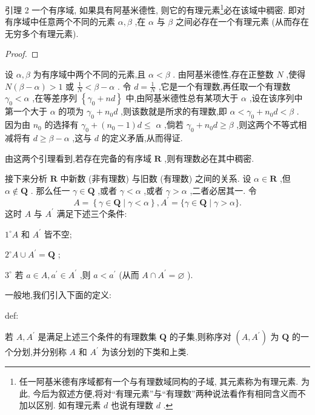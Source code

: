 引理 2 一个有序域, 如果具有阿基米德性, 则它的有理元素\footnote{任一阿基米德有序域都有一个与有理数域同构的子域, 其元素称为有理元素. 为此, 今后为叙述方便,将对“有理元素”与“有理数”两种说法看作有相同含义而不加以区别. 如有理元素 \(d\) 也说有理数 \(d\) .}必在该域中稠密. 即对有序域中任意两个不同的元素 \(\alpha ,\beta\) ,在 \(\alpha\) 与 \(\beta\) 之间必存在一个有理元素 (从而存在无穷多个有理元素).

\begin{proof}

\end{proof}
设 \(\alpha ,\beta\) 为有序域中两个不同的元素,且 \(\alpha  < \beta\) . 由阿基米德性,存在正整数 \(N\) ,使得 \(N\left( {\beta  - \alpha }\right)  > 1\) 或 \(\frac{1}{N} < \beta  - \alpha\) . 令 \(d = \frac{1}{N}\) ,它是一个有理数,再任取一个有理数 \({\gamma }_{0} < \alpha\) ,在等差序列 \(\left\{  {{\gamma }_{0} + {nd}}\right\}\) 中,由阿基米德性总有某项大于 \(\alpha\) ,设在该序列中第一个大于 \(\alpha\) 的项为 \({\gamma }_{0} + {n}_{0}d\) ,则该数就是所求的有理数,即 \(\alpha  < {\gamma }_{0} + {n}_{0}d < \beta\) . 因为由 \({n}_{0}\) 的选择有 \({\gamma }_{0} + \left( {{n}_{0} - 1}\right) d \leq\)  \(\alpha\) ,倘若 \({\gamma }_{0} + {n}_{0}d \geq  \beta\) ,则这两个不等式相减将有 \(d \geq  \beta  - \alpha\) ,这与 \(d\) 的定义矛盾,从而得证.

由这两个引理看到,若存在完备的有序域 \(\mathbf{R}\) ,则有理数必在其中稠密.

接下来分析 \(\mathbf{R}\) 中新数 (非有理数) 与旧数 (有理数) 之间的关系. 设 \(\alpha  \in  \mathbf{R}\) ,但 \(\alpha  \notin  \mathbf{Q}\) . 那么任一 \(\gamma  \in  \mathbf{Q}\) ,或者 \(\gamma  < \alpha\) ,或者 \(\gamma  > \alpha\) ,二者必居其一. 令
\[
A = \left\{  {\gamma  \in  \mathbf{Q} \mid  \gamma  < \alpha }\right\}  ,{A}^{\prime } = \{ \gamma  \in  \mathbf{Q} \mid  \gamma  > \alpha \} . \tag{1}
\]
这时 \(A\) 与 \({A}^{\prime }\) 满足下述三个条件:

\({1}^{ \circ  }A\) 和 \({A}^{\prime }\) 皆不空;

\({2}^{ \circ  }A \cup  {A}^{\prime } = \mathbf{Q}\) ;

\({3}^{ \circ  }\) 若 \(a \in  A,{a}^{\prime } \in  {A}^{\prime }\) ,则 \(a < {a}^{\prime }\) (从而 \(A \cap  {A}^{\prime } = \varnothing\) ).

一般地,我们引入下面的定义:

\begin{definition}{}{def:}

\end{definition}
若 \(A,{A}^{\prime }\) 是满足上述三个条件的有理数集 \(\mathbf{Q}\) 的子集,则称序对 \(\left( {A,{A}^{\prime }}\right)\) 为 \(\mathbf{Q}\) 的一个分划,并分别称 \(A\) 和 \({A}^{\prime }\) 为该分划的下类和上类.

